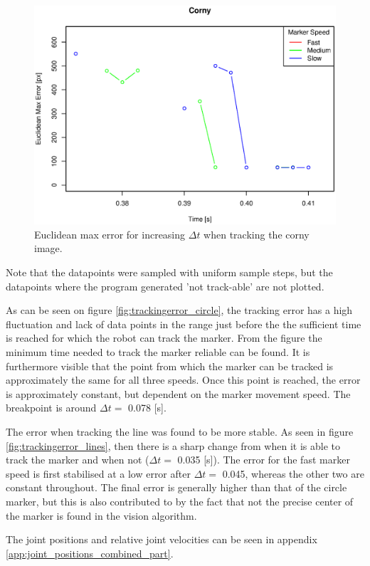 \begin{figure}[H]
\centering
\includegraphics[width= \fullImageWidth]{graphics/robotics/trackingerror_corny}
\caption{Euclidean max error for increasing $\Delta t$ when tracking the corny image.}
\label{fig:trackingerror_corny}
\end{figure}

Note that the datapoints were sampled with uniform sample steps, but the datapoints where the program generated 'not track-able' are not plotted.

As can be seen on figure \ref{fig:trackingerror_circle}, the tracking error has a high fluctuation and lack of data points in the range just before the the sufficient time is reached for which the robot can track the marker.
From the figure the minimum time needed to track the marker reliable can be found.
It is furthermore visible that the point from which the marker can be tracked is approximately the same for all three speeds.
Once this point is reached, the error is approximately constant, but dependent on the marker movement speed.
The breakpoint is around $\Delta t = $ 0.078 [s].

The error when tracking the line was found to be more stable.
As seen in figure \ref{fig:trackingerror_lines}, then there is a sharp change from when it is able to track the marker and when not ($\Delta t = $ 0.035 [s]).
The error for the fast marker speed is first stabilised at a low error after $\Delta t =$ 0.045, whereas the other two are constant throughout.
The final error is generally higher than that of the circle marker, but this is also contributed to by the fact that not the precise center of the marker is found in the vision algorithm.


The joint positions and relative joint velocities can be seen in appendix \ref{app:joint_positions_combined_part}.